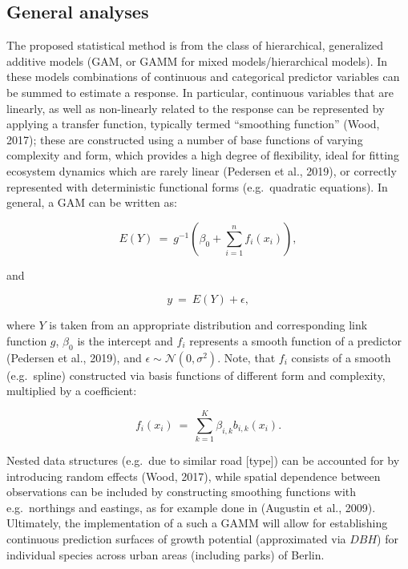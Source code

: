 \documentclass[
]{article}
\begin{document}
\hypertarget{general-analyses}{%
\subsection{General analyses}\label{general-analyses}}

The proposed statistical method is from the class of hierarchical, generalized additive models (GAM, or GAMM for mixed models/hierarchical models).
In these models combinations of continuous and categorical predictor variables can be summed to estimate a response.
In particular, continuous variables that are linearly, as well as non-linearly related to the response can be represented by applying a transfer function, typically termed ``smoothing function'' (Wood, 2017); these are constructed using a number of base functions of varying complexity and form, which provides a high degree of flexibility, ideal for fitting ecosystem dynamics which are rarely linear (Pedersen et al., 2019), or correctly represented with deterministic functional forms (e.g.~quadratic equations).
In general, a GAM can be written as:

\begin{equation}
E (Y)~=~g^{-1}\left( \beta_0 + \sum_{i = 1}^{n} f_i (x_i) \right),
\label{eq:gam-general}
\end{equation}

and

\begin{equation}
y~=~E (Y) + \epsilon,
\label{eq:gam-expectation}
\end{equation}

where \(Y\) is taken from an appropriate distribution and corresponding link function \(g\), \(\beta_0\) is the intercept and \(f_i\) represents a smooth function of a predictor (Pedersen et al., 2019), and \(\epsilon \sim \mathcal{N}(0, \sigma ^2)\).
Note, that \(f_i\) consists of a smooth (e.g.~spline) constructed via basis functions of different form and complexity, multiplied by a coefficient:

\begin{equation}
f_i(x_i)~=~\sum_{k = 1}^{K} \beta_{i, k} b_{i,k}(x_i).
\label{eq:gam-smoothers}
\end{equation}

Nested data structures (e.g.~due to similar road {[}type{]}) can be accounted for by introducing random effects (Wood, 2017), while spatial dependence between observations can be included by constructing smoothing functions with e.g.~northings and eastings, as for example done in (Augustin et al., 2009).
Ultimately, the implementation of a such a GAMM will allow for establishing continuous prediction surfaces of growth potential (approximated via \(DBH\)) for individual species across urban areas (including parks) of Berlin.
\end{document}
